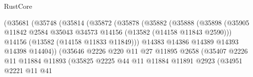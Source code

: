 \begin{lexlean}{RustCore}
\begin{coremodule}
                                    (@35681
                                      (@35748
                                        (@35814
                                          (@35872
                                            (@35878
                                              (@35882
                                                (@35888
                                                  (@35898
                                                    (@35905
                                                      @11842
                                                      @2584
                                                      @35043
                                                      @34573
                                                      @14156
                                                      (@13582 (@14158 @11843 @2590)))
                                                    @14156
                                                    (@13582 (@14158 @11833 @11849)))
                                                  @14383
                                                  @14386
                                                  @14389
                                                  @14393
                                                  @14398
                                                  @14404))
                                              (@35646
                                                @2226
                                                @220
                                                @11
                                                @27
                                                @11895
                                                @2658
                                                (@35407
                                                  @2226
                                                  @11
                                                  @11884
                                                  @11893
                                                  (@35825
                                                    @2225
                                                    @44
                                                    @11
                                                    @11884
                                                    @11891
                                                    @2923
                                                    (@34951
                                                      @2221
                                                      @11
                                                      @41

\end{coremodule}
\end{lexlean}
